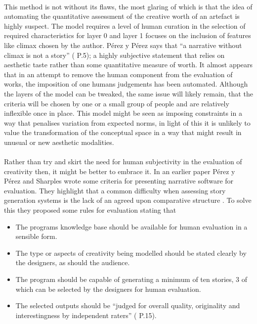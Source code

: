 \documentclass[letterpaper]{article}
\begin{document}
\\This method is not without its flaws, the most glaring of which is that the idea of automating the quantitative assessment of the creative worth of an artefact is highly suspect. The model requires a level of human curation in the selection of required characteristics for layer 0 and layer 1 focuses on the inclusion of features like climax chosen by the author. P\'erez y P\'erez says that \enquote{a narrative without climax is not a story} (\citeauthor{y2014three} \citeyear{y2014three} P.5); a highly subjective statement that relies on aesthetic taste rather than some quantitative measure of worth. It almost appears that in an attempt to remove the human component from the evaluation of works, the imposition of one humans judgements has been automated. Although the layers of the model can be tweaked, the same issue will likely remain, that the criteria will be chosen by one or a small group of people and are relatively inflexible once in place. This model might be seen as imposing constraints in a way that penalises variation from expected norms, in light of this it is unlikely to value the transformation of the conceptual space in a way that might result in unusual or new aesthetic modalities.\\
\\Rather than try and skirt the need for human subjectivity in the evaluation of creativity then, it might be better to embrace it. In an earlier paper P\'erez y P\'erez and Sharples wrote some criteria for presenting narrative software for evaluation. They highlight that a common difficulty when assessing story generation systems is the lack of an agreed upon comparative structure \cite{PEREZYPEREZ200415}. To solve this they proposed some rules for evaluation stating that
\begin{itemize}
\item The programs knowledge base should be available for human evaluation in a sensible form.
\item The type or aspects of creativity being modelled should be stated clearly by the designers, as should the audience.
\item The program should be capable of generating a minimum of ten stories, 3 of which can be selected by the designers for human evaluation.
\item The selected outputs should be \enquote{judged for overall quality, originality and interestingness by independent raters} (\citeauthor{PEREZYPEREZ200415} \citeyear{PEREZYPEREZ200415} P.15).
\end{itemize}
\end{document}

